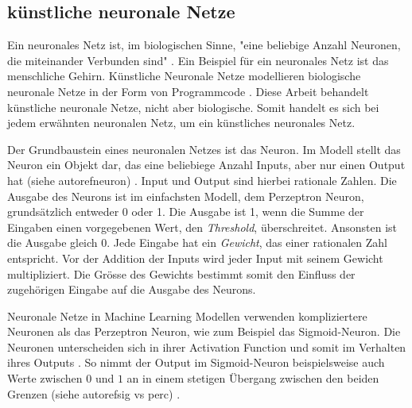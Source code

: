\subsection{künstliche neuronale Netze}\label{sub:t_ml_nn} Ein neuronales Netz
ist, im biologischen Sinne, "eine beliebige Anzahl Neuronen, die miteinander
Verbunden sind" \cite{noauthor_neuronales_2021}. Ein Beispiel für ein neuronales
Netz ist das menschliche Gehirn. Künstliche Neuronale Netze modellieren
biologische neuronale Netze in der Form von Programmcode
\cite{noauthor_artificial_nodate}. Diese Arbeit behandelt künstliche neuronale
Netze, nicht aber biologische. Somit handelt es sich bei jedem erwähnten
neuronalen Netz, um ein künstliches neuronales Netz.

Der Grundbaustein eines neuronalen Netzes ist das Neuron. Im Modell stellt das
Neuron ein Objekt dar, das eine beliebiege Anzahl Inputs, aber nur einen Output
hat (siehe autoref{neuron}) \cite{pramoditha_concept_2021}. Input und Output
sind hierbei rationale Zahlen. Die Ausgabe des Neurons ist im einfachsten
Modell, dem Perzeptron Neuron, grundsätzlich entweder 0 oder 1. Die Ausgabe ist
1, wenn die Summe der Eingaben einen vorgegebenen Wert, den \emph{Threshold},
überschreitet. Ansonsten ist die Ausgabe gleich 0. Jede Eingabe hat ein
\emph{Gewicht}, das einer rationalen Zahl entspricht. Vor der Addition der
Inputs wird jeder Input mit seinem Gewicht multipliziert.  Die Grösse des
Gewichts bestimmt somit den Einfluss der zugehörigen Eingabe auf die Ausgabe des
Neurons. \cite{nielsen_neural_2015}\cite{simplilearn_what_2021}


Neuronale Netze in Machine Learning Modellen verwenden kompliziertere Neuronen
als das Perzeptron Neuron, wie zum Beispiel das Sigmoid-Neuron. Die Neuronen
unterscheiden sich in ihrer Activation Function und somit im Verhalten ihres
Outputs \cite{pragati_baheti_activation_2022}. So nimmt der Output im Sigmoid-Neuron
beispielsweise auch Werte zwischen $0$ und $1$ an in einem stetigen Übergang
zwischen den beiden Grenzen (siehe autoref{sig vs perc}) \cite{kumar_sigmoid_2019}.


